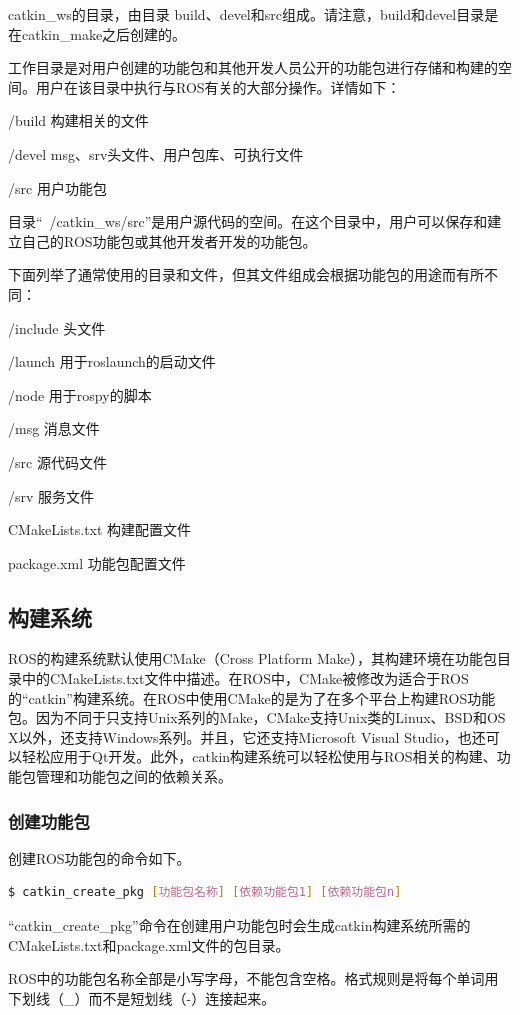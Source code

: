 \documentclass[geye,green,kindle,cn]{elegantnote}
\begin{document}
catkin\_ws的目录，由目录 build、devel和src组成。请注意，build和devel目录是在catkin\_make之后创建的。

工作目录是对用户创建的功能包和其他开发人员公开的功能包进行存储和构建的空间。用户在该目录中执行与ROS有关的大部分操作。详情如下：

/build  构建相关的文件

/devel  msg、srv头文件、用户包库、可执行文件

/src   用户功能包

目录“~/catkin\_ws/src”是用户源代码的空间。在这个目录中，用户可以保存和建立自己的ROS功能包或其他开发者开发的功能包。

下面列举了通常使用的目录和文件，但其文件组成会根据功能包的用途而有所不同：

/include  头文件

/launch  用于roslaunch的启动文件

/node  用于rospy的脚本

/msg  消息文件

/src   源代码文件

/srv   服务文件

CMakeLists.txt  构建配置文件

package.xml   功能包配置文件
\subsection{构建系统}
ROS的构建系统默认使用CMake（Cross Platform Make），其构建环境在功能包目录中的CMakeLists.txt文件中描述。在ROS中，CMake被修改为适合于ROS的“catkin”构建系统。在ROS中使用CMake的是为了在多个平台上构建ROS功能包。因为不同于只支持Unix系列的Make，CMake支持Unix类的Linux、BSD和OS X以外，还支持Windows系列。并且，它还支持Microsoft Visual Studio，也还可以轻松应用于Qt开发。此外，catkin构建系统可以轻松使用与ROS相关的构建、功能包管理和功能包之间的依赖关系。 
\subsubsection{创建功能包}
创建ROS功能包的命令如下。
\begin{lstlisting}[frame=single,language=bash]
    $ catkin_create_pkg [功能包名称] [依赖功能包1] [依赖功能包n] 
\end{lstlisting}

“catkin\_create\_pkg”命令在创建用户功能包时会生成catkin构建系统所需的CMakeLists.txt和package.xml文件的包目录。

ROS中的功能包名称全部是小写字母，不能包含空格。格式规则是将每个单词用下划线（\_）而不是短划线（-）连接起来。
\end{document}
